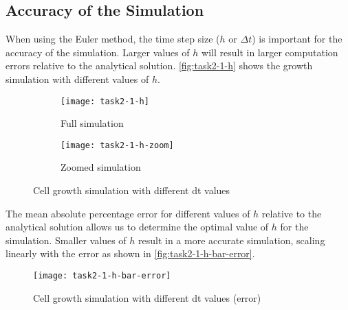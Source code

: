 \clearpage

\subsection{Accuracy of the Simulation}


When using the Euler method, the time step size ($h$ or $\Delta t$) is important for the accuracy of the simulation.
Larger values of $h$ will result in larger computation errors relative to the analytical solution.
\autoref{fig:task2-1-h} shows the growth  simulation with different values of $h$.

\begin{figure}[ht]
    \centering
    \begin{subfigure}{\textwidth}
        \centering
        \texttt{[image: task2-1-h]}
        \caption[Full simulation]{Full simulation}
        \label{fig:task2-1-h-full}
    \end{subfigure}

    \begin{subfigure}{\textwidth}
        \centering
        \texttt{[image: task2-1-h-zoom]}
        \caption[Zoomed simulation]{Zoomed simulation}
        \label{fig:task2-1-h-zoom}
    \end{subfigure}
    \caption[Cell growth simulation with different dt values]{Cell growth simulation with different dt values}
    \label{fig:task2-1-h}
\end{figure}

The mean absolute percentage error for different values of $h$ relative to the analytical solution allows us to determine the optimal value of $h$ for the simulation.
Smaller values of $h$ result in a more accurate simulation, scaling linearly with the error as shown in \autoref{fig:task2-1-h-bar-error}.

\begin{figure}[!ht]
    \centering
    \texttt{[image: task2-1-h-bar-error]}
    \caption[Cell growth simulation with different dt values (error)]{Cell growth simulation with different dt values (error)}
    \label{fig:task2-1-h-bar-error}
\end{figure}



